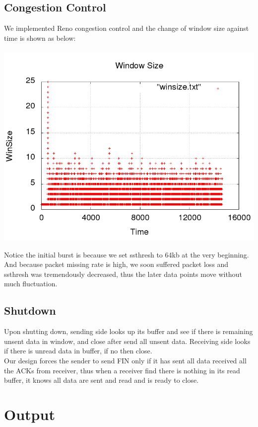 \documentclass[paper=a4, fontsize=11pt]{scrartcl} %
\numberwithin{equation}{section} %
\numberwithin{figure}{section} %
\numberwithin{table}{section} %
\begin{document}
\subsection{Congestion Control}
We implemented Reno congestion control and the change of window size against time is shown as below:\\\\
\includegraphics[scale=0.8]{winsize.png}

Notice the initial burst is because we set ssthresh to 64kb at the very beginning. And because packet missing rate is high, we soon suffered packet loss and ssthresh was tremendously decreased, thus the later data points move without much fluctuation. 

\subsection{Shutdown}
Upon shutting down, sending side looks up its buffer and see if there is remaining unsent data in window, and close after send all unsent data. Receiving side looks if there is unread data in buffer, if no then close.\\

Our design forces the sender to send FIN only if it has sent all data received all the ACKs from receiver, thus when a receiver find there is nothing in its read buffer, it knows all data are sent and read and is ready to close.

\section{Output}
\end{document}
